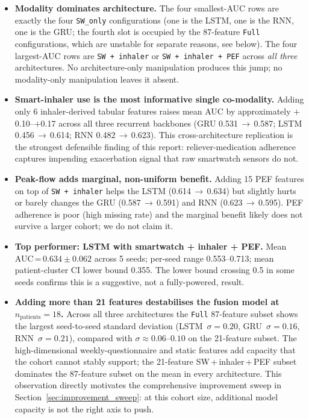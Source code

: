 \documentclass[11pt,a4paper]{article}
\begin{document}
\begin{itemize}[nosep]
  \item \textbf{Modality dominates architecture.}  The four
        smallest-AUC rows are exactly the four \texttt{SW\_only}
        configurations (one is the LSTM, one is the RNN, one is the
        GRU; the fourth slot is occupied by the 87-feature \texttt{Full}
        configurations, which are unstable for separate reasons,
        see below).  The four largest-AUC rows are
        \texttt{SW\,+\,inhaler} or \texttt{SW\,+\,inhaler\,+\,PEF}
        across \emph{all three} architectures.  No architecture-only
        manipulation produces this jump; no modality-only manipulation
        leaves it absent.

  \item \textbf{Smart-inhaler use is the most informative single
        co-modality.}  Adding only 6 inhaler-derived tabular features
        raises mean AUC by approximately
        $+$0.10--$+$0.17 across all three recurrent backbones (GRU
        0.531\,$\to$\,0.587; LSTM 0.456\,$\to$\,0.614; RNN
        0.482\,$\to$\,0.623).  This cross-architecture replication is
        the strongest defensible finding of this report:
        reliever-medication adherence captures impending exacerbation
        signal that raw smartwatch sensors do not.

  \item \textbf{Peak-flow adds marginal, non-uniform benefit.}  Adding
        15 PEF features on top of \texttt{SW\,+\,inhaler} helps the LSTM
        (0.614\,$\to$\,0.634) but slightly hurts or barely changes the
        GRU (0.587\,$\to$\,0.591) and RNN (0.623\,$\to$\,0.595).  PEF
        adherence is poor (high missing rate) and the marginal benefit
        likely does not survive a larger cohort; we do not claim it.

  \item \textbf{Top performer: LSTM with smartwatch + inhaler + PEF.}
        Mean AUC\,=\,$0.634 \pm 0.062$ across 5 seeds; per-seed range
        0.553--0.713; mean patient-cluster CI lower bound 0.355.  The
        lower bound crossing 0.5 in some seeds confirms this is a
        suggestive, not a fully-powered, result.

  \item \textbf{Adding more than 21 features destabilises the fusion
        model at $n_\text{patients}{=}18$.}  Across all three
        architectures the \texttt{Full} 87-feature subset shows the
        largest seed-to-seed standard deviation
        (LSTM~$\sigma{=}0.20$, GRU~$\sigma{=}0.16$, RNN~$\sigma{=}0.21$),
        compared with $\sigma\!\approx\!0.06$--$0.10$ on the 21-feature
        subset.  The high-dimensional weekly-questionnaire and static
        features add capacity that the cohort cannot stably support;
        the 21-feature SW\,+\,inhaler\,+\,PEF subset dominates the
        87-feature subset on the mean in every architecture.  This
        observation directly motivates the comprehensive improvement
        sweep in Section~\ref{sec:improvement_sweep}: at this cohort
        size, additional model capacity is not the right axis to push.
\end{itemize}
\end{document}
